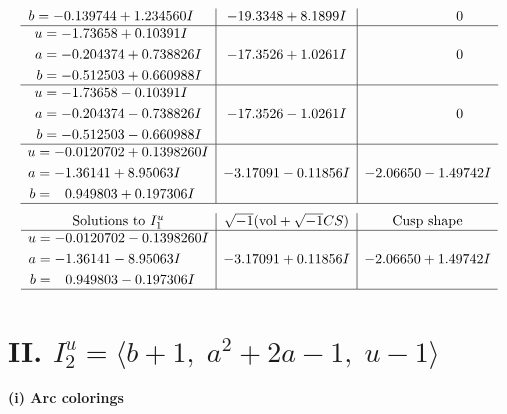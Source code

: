 \documentclass[1p]{elsarticle_modified}
\theoremstyle{definition}
\newcommand{\I}{\sqrt{-1}}
\begin{document}
$$\begin{array}{c|c|c}
\begin{aligned}
b &= -0.139744 + 1.234560 I\end{aligned}
 & -19.3348 + 8.1899 I & \phantom{-0.000000 } 0 \\ \hline\begin{aligned}
u &= -1.73658 + 0.10391 I \\
a &= -0.204374 + 0.738826 I \\
b &= -0.512503 + 0.660988 I\end{aligned}
 & -17.3526 + 1.0261 I & \phantom{-0.000000 } 0 \\ \hline\begin{aligned}
u &= -1.73658 - 0.10391 I \\
a &= -0.204374 - 0.738826 I \\
b &= -0.512503 - 0.660988 I\end{aligned}
 & -17.3526 - 1.0261 I & \phantom{-0.000000 } 0 \\ \hline\begin{aligned}
u &= -0.0120702 + 0.1398260 I \\
a &= -1.36141 + 8.95063 I \\
b &= \phantom{-}0.949803 + 0.197306 I\end{aligned}
 & -3.17091 - 0.11856 I & -2.06650 - 1.49742 I\\
 \hline 
 \end{array}$$\newpage$$\begin{array}{c|c|c}  
\text{Solutions to }I^u_{1}& \I (\text{vol} + \sqrt{-1}CS) & \text{Cusp shape}\\
 \hline 
\begin{aligned}
u &= -0.0120702 - 0.1398260 I \\
a &= -1.36141 - 8.95063 I \\
b &= \phantom{-}0.949803 - 0.197306 I\end{aligned}
 & -3.17091 + 0.11856 I & -2.06650 + 1.49742 I\\
 \hline 
 \end{array}$$\newpage\newpage\renewcommand{\arraystretch}{1}
\centering \section*{II. $I^u_{2}= \langle b+1,\;a^2+2 a-1,\;u-1 \rangle$}
\flushleft \textbf{(i) Arc colorings}\\
\end{document}
